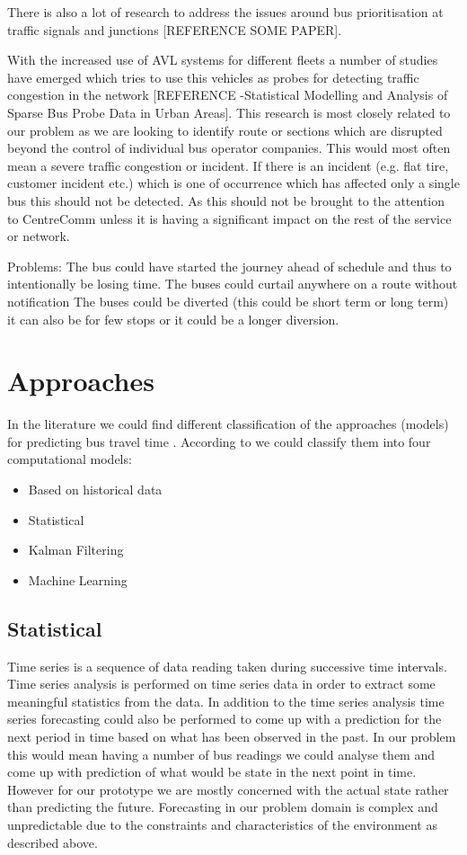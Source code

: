 There is also a lot of research to address the issues around bus prioritisation at traffic signals and junctions [REFERENCE SOME PAPER].

With the increased use of AVL systems for different fleets a number of studies have emerged which tries to use this vehicles as probes for detecting traffic congestion in the network [REFERENCE -Statistical Modelling and Analysis of Sparse Bus Probe Data in Urban Areas]. This research is most closely related to our problem as we are looking to identify route or sections which are disrupted beyond the control of individual bus operator companies. This would most often mean a severe traffic congestion or incident. If there is an incident (e.g. flat tire, customer incident etc.) which is one of occurrence which has affected only a single bus this should not be detected. As this should not be brought to the attention to CentreComm unless it is having a significant impact on the rest of the service or network.

Problems:
The bus could have started the journey ahead of schedule and thus to intentionally be losing time.
The buses could curtail anywhere on a route without notification
The buses could be diverted (this could be short term or long term) it can also be for few stops or it could be a longer diversion.

\section{Approaches}
In the literature we could find different classification of the approaches (models) for predicting bus travel time \cite{surveyAIApplications}. According to \cite{urbanBusArrivalTimeCompModels} we could classify them into four computational models:
\begin{itemize}
	\item Based on historical data
	\item Statistical 
	\item Kalman Filtering 
	\item Machine Learning
\end{itemize}
	\subsection{Statistical}
Time series is a sequence of data reading taken during successive time intervals. Time series analysis is performed on time series data in order to extract some meaningful statistics from the data. In addition to the time series analysis time series forecasting could also be performed to come up with a prediction for the next period in time based on what has been observed in the past. In our problem this would mean having a number of bus readings we could analyse them and come up with prediction of what would be state in the next point in time. However for our prototype we are mostly concerned with the actual state rather than predicting the future. Forecasting in our problem domain is complex and unpredictable due to the constraints and characteristics of the environment as described above.

